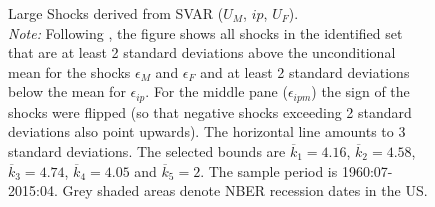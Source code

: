 \documentclass[a4paper,11pt,listof=nochaptergap,oneside,pointednumbers,bibtotoc,bigheadings,liststotoc,hidelinks]{scrbook}
\theoremstyle{mysatz}
\theoremstyle{mydefinition}
\theoremstyle{mytheorem}
\theoremstyle{mybemerkung}
\begin{document}
\begin{figure}[!h]
   \centering
   \setlength\fboxsep{0pt}
   \setlength\fboxrule{0pt}
      \caption[Large Shocks derived from SVAR ($U_{M}$, $ip$, $U_{F}$).]{Large Shocks derived from SVAR ($U_{M}$, $ip$, $U_{F}$).\\
      \textit{Note:} Following \citet{ludvigsonetal:18}, the figure shows all shocks in the identified set that are at least 2 standard deviations above the unconditional mean for the shocks $\epsilon_{M}$ and $\epsilon_{F}$ and at least 2 standard deviations below the mean for $\epsilon_{ip}$. For the middle pane ($\epsilon_{ipm}$) the sign of the shocks were flipped (so that negative shocks exceeding 2 standard deviations also point upwards). The horizontal line amounts to 3 standard deviations. The selected bounds are $\overline{k}_1 = 4.16$, $\overline{k}_2 = 4.58$, $\overline{k}_3 = 4.74$, $\overline{k}_4 = 4.05$ and $\overline{k}_5 = 2$. The sample period is 1960:07-2015:04. Grey shaded areas denote NBER recession dates in the US.}   \label{fig:ludvigsonetal_timeseries_e_largeshocks}
\end{figure}
\end{document}
